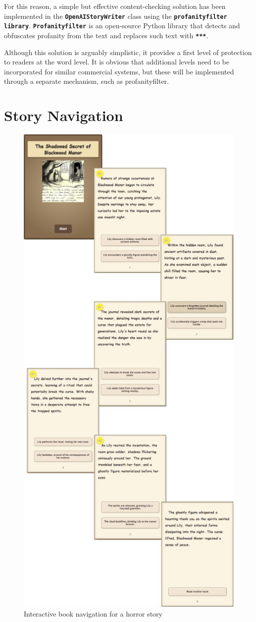 \documentclass[conference]{IEEEtran}
\begin{document}
	For this reason, a simple but effective content-checking solution has been implemented in the \textbf{\texttt{OpenAIStoryWriter}} class using the \textbf{\texttt{profanityfilter library}}. \textbf{\texttt{Profanityfilter}} is an open-source Python library that detects and obfuscates profanity from the text and replaces such text with \textbf{\texttt{***}}.
	
	Although this solution is arguably simplistic, it provides a first level of protection to readers at the word level. It is obvious that additional levels need to be incorporated for similar commercial systems, but these will be implemented through a separate mechanism, such as profanityfilter.
	
	
	
	
\printbibliography
\onecolumn
\pagebreak

\appendices

\section{Story Navigation}
\label{appendix:navigation}
	
	
	\begin{figure}[H]
		\centering
		\includegraphics[width=0.5\linewidth]{img/img-ari3333-project-report-story-horror}
		\caption{Interactive book navigation for a horror story}
		\label{fig:img-ari3333-project-report-story-horror}
	\end{figure}
	
\end{document}
